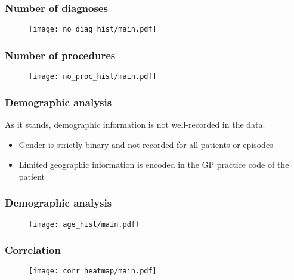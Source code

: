 \begin{frame}
    \frametitle{Number of diagnoses}

    \begin{figure}
    \texttt{[image: no\_diag\_hist/main.pdf]}
    \end{figure}
\end{frame}

\begin{frame}
    \frametitle{Number of procedures}

    \begin{figure}
    \texttt{[image: no\_proc\_hist/main.pdf]}
    \end{figure}
\end{frame}

\begin{frame}
    \frametitle{Demographic analysis}

    As it stands, demographic information is not well-recorded in the data.

    \vspace{10pt}
    \begin{itemize}
        \pause%
        \item Gender is strictly binary and not recorded for all patients or
            episodes
        \pause%
        \item Limited geographic information is encoded in the GP practice code
            of the patient
    \end{itemize}
\end{frame}

\begin{frame}
    \frametitle{Demographic analysis}

    \begin{figure}
    \texttt{[image: age\_hist/main.pdf]}
    \end{figure}
\end{frame}

\begin{frame}
    \frametitle{Correlation}

    \vspace{-15pt}
    \begin{figure}
    \texttt{[image: corr\_heatmap/main.pdf]}
    \end{figure}
\end{frame}
